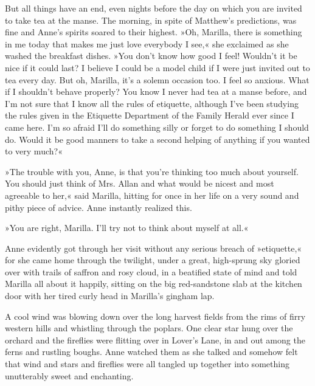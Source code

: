 But all things have an end, even nights before the day on which you are invited to take tea at the manse. The morning, in spite of Matthew's predictions, was fine and Anne's spirits soared to their highest. »Oh, Marilla, there is something in me today that makes me just love everybody I see,« she exclaimed as she washed the breakfast dishes. »You don't know how good I feel! Wouldn't it be nice if it could last? I believe I could be a model child if I were just invited out to tea every day. But oh, Marilla, it's a solemn occasion too. I feel so anxious. What if I shouldn't behave properly? You know I never had tea at a manse before, and I'm not sure that I know all the rules of etiquette, although I've been studying the rules given in the Etiquette Department of the Family Herald ever since I came here. I'm so afraid I'll do something silly or forget to do something I should do. Would it be good manners to take a second helping of anything if you wanted to very much?«

»The trouble with you, Anne, is that you're thinking too much about yourself. You should just think of Mrs. Allan and what would be nicest and most agreeable to her,« said Marilla, hitting for once in her life on a very sound and pithy piece of advice. Anne instantly realized this.

»You are right, Marilla. I'll try not to think about myself at all.«

Anne evidently got through her visit without any serious breach of »etiquette,« for she came home through the twilight, under a great, high-sprung sky gloried over with trails of saffron and rosy cloud, in a beatified state of mind and told Marilla all about it happily, sitting on the big red-sandstone slab at the kitchen door with her tired curly head in Marilla's gingham lap.

A cool wind was blowing down over the long harvest fields from the rims of firry western hills and whistling through the poplars. One clear star hung over the orchard and the fireflies were flitting over in Lover's Lane, in and out among the ferns and rustling boughs. Anne watched them as she talked and somehow felt that wind and stars and fireflies were all tangled up together into something unutterably sweet and enchanting.

